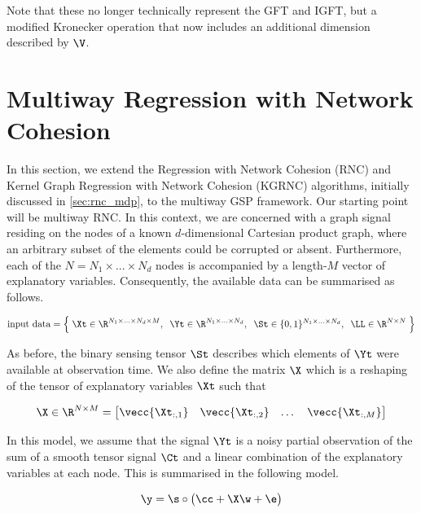 Note that these no longer technically represent the GFT and IGFT, but a modified Kronecker operation that now includes an additional dimension described by $\V$. 


\section{Multiway Regression with Network Cohesion}

\label{sec:rnc_dd}

In this section, we extend the Regression with Network Cohesion (RNC) and Kernel Graph Regression with Network Cohesion (KGRNC) algorithms, initially discussed in \cref{sec:rnc_mdp}, to the multiway GSP framework. Our starting point will be multiway RNC. In this context, we are concerned with a graph signal residing on the nodes of a known $d$-dimensional Cartesian product graph, where an arbitrary subset of the elements could be corrupted or absent. Furthermore, each of the $N = N_1 \times ... \times N_d$ nodes is accompanied by a length-$M$ vector of explanatory variables. Consequently, the available data can be summarised as follows.

\begin{equation*}
    \text{input data} = \Big\{ \;\Xt \in \R^{N_1 \times ... \times N_d \times M}, \;\; \Yt \in \R^{N_1 \times ... \times N_d}, \;\; \St \in \{0, 1\}^{N_1 \times ... \times N_d}, \;\; \LL \in \R^{N \times N} \; \Big\}
\end{equation*}

As before, the binary sensing tensor $\St$ describes which elements of $\Yt$ were available at observation time. We also define the matrix $\X$ which is a reshaping of the tensor of explanatory variables $\Xt$ such that

\begin{equation}
    \label{eq:X_RNC_dd}
    \X \in \R^{N \times M} = \begin{bmatrix} \vecc{\Xt_{:, 1}} & \vecc{\Xt_{:, 2}} & \dots & \vecc{\Xt_{:, M}} \end{bmatrix}    
\end{equation}

In this model, we assume that the signal $\Yt$ is a noisy partial observation of the sum of a smooth tensor signal $\Ct$ and a linear combination of the explanatory variables at each node. This is summarised in the following model. 

\begin{equation}
    \label{eq:rnc_stat_model_wc_dd}
    \y = \s \circ \big( \cc + \X \w  + \e \big)
\end{equation}

